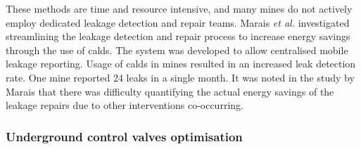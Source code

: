 	 	 These methods are time and resource intensive, and many mines do not actively employ dedicated leakage detection and repair teams. Marais \textit{et al.} \cite{marais2009increased} investigated streamlining the leakage detection and repair process to increase energy savings through the use of \gls{calds}. The system was developed to allow centralised mobile leakage reporting. Usage of \gls{calds} in mines resulted in an increased leak detection rate. One mine reported 24 leaks in a single month. It was noted in the study by Marais that there was difficulty quantifying the actual energy savings of the leakage repairs due to other interventions co-occurring.	
		 
		 \subsubsection{Underground control valves optimisation}
		 
